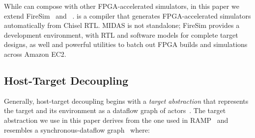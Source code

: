 While \PNAME can compose with other FPGA-accelerated simulators, in this paper
we extend FireSim~\cite{firesim} and {\SIMNAME}~\cite{midas}. \SIMNAME is a
compiler that generates FPGA-accelerated simulators automatically from Chisel
RTL. MIDAS is not standalone; FireSim provides a development
environment, with RTL and software models for complete target designs, as well
and powerful utilities to batch out FPGA builds and simulations across Amazon EC2.

\subsection{Host-Target Decoupling}\label{sec:target-decoupling}
Generally, host-target decoupling begins with a \emph{target abstraction} that
represents the target and its environment as a dataflow graph of actors~\cite{LIBDN,APortNetworks}.  The target abstraction we use in this paper
derives from the one used in RAMP~\cite{RAMP} and resembles a
synchronous-dataflow graph~\cite{SDF} where:

